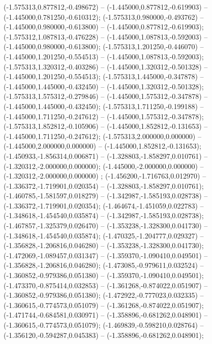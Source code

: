 (-1.575313,0.877812,-0.498672) -- (-1.445000,0.877812,-0.619903) -- (-1.445000,0.781250,-0.610312);
 (-1.575313,0.980000,-0.493762) -- (-1.445000,0.980000,-0.613800) -- (-1.445000,0.877812,-0.619903);
 (-1.575312,1.087813,-0.476228) -- (-1.445000,1.087813,-0.592003) -- (-1.445000,0.980000,-0.613800);
 (-1.575313,1.201250,-0.446070) -- (-1.445000,1.201250,-0.554513) -- (-1.445000,1.087813,-0.592003);
 (-1.575313,1.320312,-0.403286) -- (-1.445000,1.320312,-0.501328) -- (-1.445000,1.201250,-0.554513);
 (-1.575313,1.445000,-0.347878) -- (-1.445000,1.445000,-0.432450) -- (-1.445000,1.320312,-0.501328);
 (-1.575313,1.575312,-0.279846) -- (-1.445000,1.575312,-0.347878) -- (-1.445000,1.445000,-0.432450);
 (-1.575313,1.711250,-0.199188) -- (-1.445000,1.711250,-0.247612) -- (-1.445000,1.575312,-0.347878);
 (-1.575313,1.852812,-0.105906) -- (-1.445000,1.852812,-0.131653) -- (-1.445000,1.711250,-0.247612);
 (-1.575313,2.000000,0.000000) -- (-1.445000,2.000000,0.000000) -- (-1.445000,1.852812,-0.131653);
 (-1.450933,-1.856314,0.006871) -- (-1.328803,-1.858297,0.010761) -- (-1.320312,-2.000000,0.000000);
 (-1.445000,-2.000000,0.000000) -- (-1.320312,-2.000000,0.000000) ;
 (-1.456200,-1.716763,0.012970) -- (-1.336372,-1.719901,0.020354) -- (-1.328803,-1.858297,0.010761);
 (-1.460785,-1.581597,0.018279) -- (-1.342987,-1.585193,0.028738) -- (-1.336372,-1.719901,0.020354);
 (-1.464674,-1.451059,0.022783) -- (-1.348618,-1.454540,0.035874) -- (-1.342987,-1.585193,0.028738);
 (-1.467857,-1.325379,0.026470) -- (-1.353238,-1.328300,0.041730) -- (-1.348618,-1.454540,0.035874);
 (-1.470325,-1.204777,0.029327) -- (-1.356828,-1.206816,0.046280) -- (-1.353238,-1.328300,0.041730);
 (-1.472069,-1.089457,0.031347) -- (-1.359370,-1.090410,0.049501) -- (-1.356828,-1.206816,0.046280);
 (-1.473085,-0.979611,0.032524) -- (-1.360852,-0.979386,0.051380) -- (-1.359370,-1.090410,0.049501);
 (-1.473370,-0.875414,0.032853) -- (-1.361268,-0.874022,0.051907) -- (-1.360852,-0.979386,0.051380);
 (-1.472922,-0.777023,0.032335) -- (-1.360615,-0.774573,0.051079) -- (-1.361268,-0.874022,0.051907);
 (-1.471744,-0.684581,0.030971) -- (-1.358896,-0.681262,0.048901) -- (-1.360615,-0.774573,0.051079);
 (-1.469839,-0.598210,0.028764) -- (-1.356120,-0.594287,0.045383) -- (-1.358896,-0.681262,0.048901);
